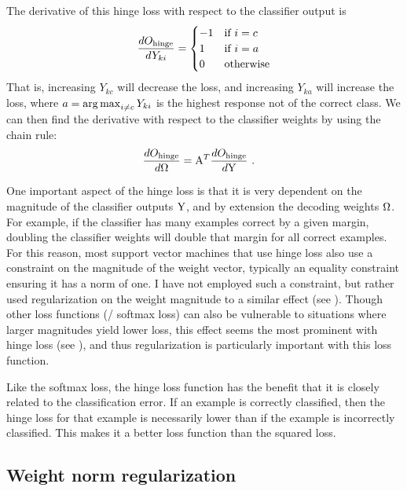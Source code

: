 The derivative of this hinge loss with respect to the classifier output is
\begin{align}
  \frac{dO_\text{hinge}}{dY_{ki}} = \begin{cases}
    -1 & \text{if } i = c \\
    1 & \text{if } i = a \\
    0 & \text{otherwise}
  \end{cases}
\end{align}
That is, increasing $Y_{kc}$ will decrease the loss,
and increasing $Y_{ka}$ will increase the loss,
where $a = \operatorname*{arg\,max}_{i \ne c} Y_{ki}$ is the highest response not of the correct class.
We can then find the derivative with respect to the classifier weights
by using the chain rule:
\begin{align}
  \frac{dO_\text{hinge}}{d\Omega} &= \mathrm{A}^T \frac{dO_\text{hinge}}{d\mathrm{Y}} \text{ .}
\end{align}

One important aspect of the hinge loss is that it is
very dependent on the magnitude of the classifier outputs $\mathrm{Y}$,
and by extension the decoding weights $\Omega$.
For example, if the classifier has many examples correct by a given margin,
doubling the classifier weights will double that margin for all correct examples.
For this reason, most support vector machines that use hinge loss
also use a constraint on the magnitude of the weight vector,
typically an equality constraint ensuring it has a norm of one.
I have not employed such a constraint,
but rather used regularization on the weight magnitude
to a similar effect (see ).
Though other loss functions (\eg/ softmax loss)
can also be vulnerable to situations where larger magnitudes yield lower loss,
this effect seems the most prominent with hinge loss (see ),
and thus regularization is particularly important with this loss function.

Like the softmax loss,
the hinge loss function has the benefit
that it is closely related to the classification error.
If an example is correctly classified,
then the hinge loss for that example is necessarily lower
than if the example is incorrectly classified.
This makes it a better loss function than the squared loss.



\subsection{Weight norm regularization}

